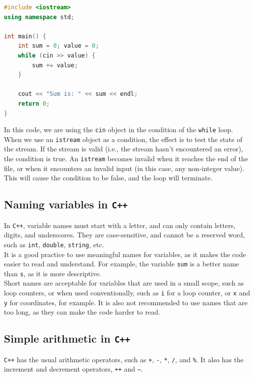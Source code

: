 \begin{lstlisting}[language=C++]
#include <iostream>
using namespace std;

int main() {
    int sum = 0; value = 0;
    while (cin >> value) {
        sum += value;
    }

    cout << "Sum is: " << sum << endl;
    return 0;
}
\end{lstlisting}

In this code, we are using the \texttt{cin} object in the condition of the \texttt{while} loop. When 
we use an \texttt{istream} object as a condition, the effect is to test the state of the stream. If the
stream is valid (i.e., the stream hasn't encountered an error), the condition is true. An \texttt{istream}
becomes invalid when it reaches the end of the file, or when it encounters an invalid input (in this case, 
any non-integer value). This will cause the condition to be false, and the loop will terminate.\\

\subsection{Naming variables in \texttt{C++}}

In \texttt{C++}, variable names must start with a letter, and can only contain letters, digits, 
and underscores. They are case-sensitive, and cannot be a reserved word, such as \texttt{int},
\texttt{double}, \texttt{string}, etc.\\

It is a good practice to use meaningful names for variables, as it makes the code easier to read and
understand. For example, the variable \texttt{sum} is a better name than \texttt{s}, as it is more
descriptive.\\

Short names are acceptable for variables that are used in a small scope, such as loop counters, or when
used conventionally, such as \texttt{i} for a loop counter, or \texttt{x} and \texttt{y} for coordinates,
for example. It is also not recommended to use names that are too long, as they can make the code harder
to read.\\

\subsection{Simple arithmetic in \texttt{C++}}

\texttt{C++} has the usual arithmetic operators, such as \texttt{+}, \texttt{-}, \texttt{*}, \texttt{/},
and \texttt{\%}. It also has the increment and decrement operators, \texttt{++} and \texttt{--}.\\

